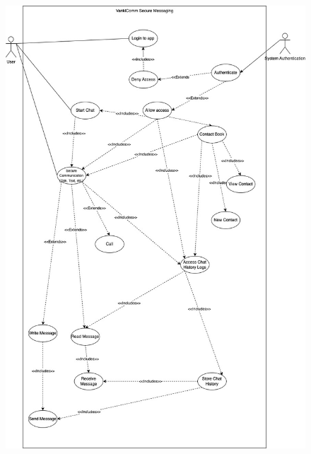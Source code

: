 \documentclass[]{article}
\begin{document}
\begin{figure}[p]
    \centering
    \includegraphics[width=\paperwidth,height=0.75\paperheight,keepaspectratio]{UseCase.jpg}
\end{figure}


%
%
%
\end{document}
